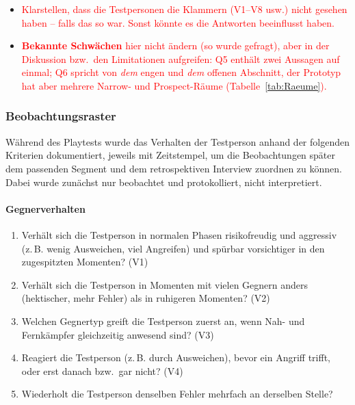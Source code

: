 \documentclass[../Main.tex]{subfiles}
\begin{document}
\begin{itemize}[leftmargin=1.5cm]
    \item \textcolor{red}{Klarstellen, dass die Testpersonen die Klammern (V1--V8 usw.) nicht gesehen haben -- falls das so war. Sonst könnte es die Antworten beeinflusst haben.}
    \item \textcolor{red}{\textbf{Bekannte Schwächen} hier nicht ändern (so wurde gefragt), aber in der Diskussion bzw.\ den Limitationen aufgreifen: Q5 enthält zwei Aussagen auf einmal; Q6 spricht von \emph{dem} engen und \emph{dem} offenen Abschnitt, der Prototyp hat aber mehrere Narrow- und Prospect-Räume (Tabelle~\ref{tab:Raeume}).}
\end{itemize}

\subsubsection{Beobachtungsraster} \label{sec:Beobachtungsraster}

Während des Playtests wurde das Verhalten der Testperson anhand der folgenden Kriterien dokumentiert, jeweils mit Zeitstempel, um die Beobachtungen später dem passenden Segment und dem retrospektiven Interview zuordnen zu können. Dabei wurde zunächst nur beobachtet und protokolliert, nicht interpretiert.

\paragraph{Gegnerverhalten}
\begin{enumerate}[label=\textbf{B\arabic*}, leftmargin=1.5cm, itemsep=0.5em]
    \item Verhält sich die Testperson in normalen Phasen risikofreudig und aggressiv (z.\,B. wenig Ausweichen, viel Angreifen) und spürbar vorsichtiger in den zugespitzten Momenten? \hfill (V1)
    \item Verhält sich die Testperson in Momenten mit vielen Gegnern anders (hektischer, mehr Fehler) als in ruhigeren Momenten? \hfill (V2)
    \item Welchen Gegnertyp greift die Testperson zuerst an, wenn Nah- und Fernkämpfer gleichzeitig anwesend sind? \hfill (V3)
    \item Reagiert die Testperson (z.\,B. durch Ausweichen), bevor ein Angriff trifft, oder erst danach bzw.\ gar nicht? \hfill (V4)
    \item Wiederholt die Testperson denselben Fehler mehrfach an derselben Stelle?
\end{enumerate}
\end{document}
